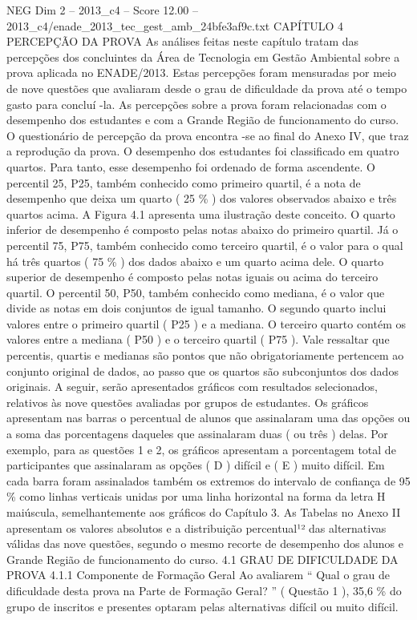 \begin{textsample}{NEG Dim 2 – 2013\_c4 – Score 12.00 – 2013\_c4/enade\_2013\_tec\_gest\_amb\_24bfe3af9c.txt}  \label{ex:f2_neg_372}
CAPÍTULO 4 PERCEPÇÃO DA PROVA As análises feitas neste capítulo tratam das percepções dos concluintes da Área de Tecnologia em Gestão Ambiental sobre a prova aplicada no ENADE/2013.
Estas percepções foram mensuradas por meio de nove questões que avaliaram desde o grau de dificuldade da prova até o tempo gasto para concluí -la.
As percepções sobre a prova foram relacionadas com o desempenho dos estudantes e com a Grande Região de funcionamento do curso.
O questionário de percepção da prova encontra -se ao final do Anexo IV, que traz a reprodução da prova.
O desempenho dos estudantes foi classificado em quatro quartos.
Para tanto, esse desempenho foi ordenado de forma ascendente.
O percentil 25, P25, também conhecido como primeiro quartil, é a nota de desempenho que deixa um quarto ( 25 \% ) dos valores observados abaixo e três quartos acima.
A Figura 4.1 apresenta uma ilustração deste conceito.
O quarto inferior de desempenho é composto pelas notas abaixo do primeiro quartil.
Já o percentil 75, P75, também conhecido como terceiro quartil, é o valor para o qual há três quartos ( 75 \% ) dos dados abaixo e um quarto acima dele.
O quarto superior de desempenho é composto pelas notas iguais ou acima do terceiro quartil.
O percentil 50, P50, também conhecido como mediana, é o valor que divide as notas em dois conjuntos de igual tamanho.
O segundo quarto inclui valores entre o primeiro quartil ( P25 ) e a mediana.
O terceiro quarto contém os valores entre a mediana ( P50 ) e o terceiro quartil ( P75 ).
Vale ressaltar que percentis, quartis e medianas são pontos que não obrigatoriamente pertencem ao conjunto original de dados, ao passo que os quartos são subconjuntos dos dados originais.
A seguir, serão apresentados gráficos com resultados selecionados, relativos às nove questões avaliadas por grupos de estudantes.
Os gráficos apresentam nas barras o percentual de alunos que assinalaram uma das opções ou a soma das porcentagens daqueles que assinalaram duas ( ou três ) delas.
Por exemplo, para as questões 1 e 2, os gráficos apresentam a porcentagem total de participantes que assinalaram as opções ( D ) difícil e ( E ) muito difícil.
Em cada barra foram assinalados também os extremos do intervalo de confiança de 95 \% como linhas verticais unidas por uma linha horizontal na forma da letra H maiúscula, semelhantemente aos gráficos do Capítulo 3.
As Tabelas no Anexo II apresentam os valores absolutos e a distribuição percentual¹² das alternativas válidas das nove questões, segundo o mesmo recorte de desempenho dos alunos e Grande Região de funcionamento do curso. 4.1 GRAU DE DIFICULDADE DA PROVA 4.1.1 Componente de Formação Geral Ao avaliarem “ Qual o grau de dificuldade desta prova na Parte de Formação Geral? ” ( Questão 1 ), 35,6 \% do grupo de inscritos e presentes optaram pelas alternativas difícil ou muito difícil.

\end{textsample}
